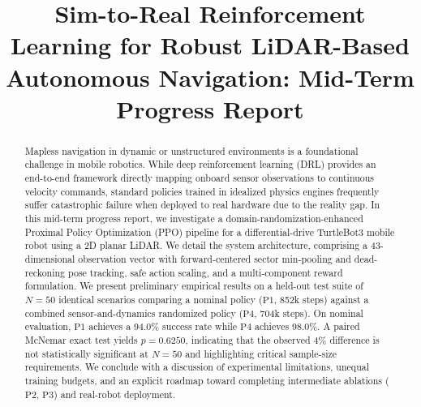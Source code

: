 \documentclass[conference]{IEEEtran}
\begin{document}
\title{Sim-to-Real Reinforcement Learning for Robust LiDAR-Based Autonomous Navigation: Mid-Term Progress Report}

\author{
\and
{}
}

\maketitle

\begin{abstract}
Mapless navigation in dynamic or unstructured environments is a foundational challenge in mobile robotics. While deep reinforcement learning (DRL) provides an end-to-end framework directly mapping onboard sensor observations to continuous velocity commands, standard policies trained in idealized physics engines frequently suffer catastrophic failure when deployed to real hardware due to the reality gap. In this mid-term progress report, we investigate a domain-randomization-enhanced Proximal Policy Optimization (PPO) pipeline for a differential-drive TurtleBot3 mobile robot using a 2D planar LiDAR. We detail the system architecture, comprising a 43-dimensional observation vector with forward-centered sector min-pooling and dead-reckoning pose tracking, safe action scaling, and a multi-component reward formulation. We present preliminary empirical results on a held-out test suite of $N=50$ identical scenarios comparing a nominal policy ($\text{P1}$, 852k steps) against a combined sensor-and-dynamics randomized policy ($\text{P4}$, 704k steps). On nominal evaluation, $\text{P1}$ achieves a 94.0\% success rate while $\text{P4}$ achieves 98.0\%. A paired McNemar exact test yields $p = 0.6250$, indicating that the observed 4\% difference is not statistically significant at $N=50$ and highlighting critical sample-size requirements. We conclude with a discussion of experimental limitations, unequal training budgets, and an explicit roadmap toward completing intermediate ablations ($\text{P2}$, $\text{P3}$) and real-robot deployment.
\end{abstract}
\end{document}
